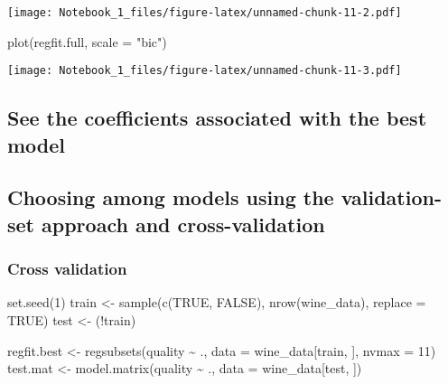 \documentclass[
]{article}
\newenvironment{Shaded}{\begin{snugshade}}{\end{snugshade}}
\newcommand{\AttributeTok}[1]{\textcolor[rgb]{0.77,0.63,0.00}{#1}}
\newcommand{\ConstantTok}[1]{\textcolor[rgb]{0.00,0.00,0.00}{#1}}
\newcommand{\DecValTok}[1]{\textcolor[rgb]{0.00,0.00,0.81}{#1}}
\newcommand{\FunctionTok}[1]{\textcolor[rgb]{0.00,0.00,0.00}{#1}}
\newcommand{\NormalTok}[1]{#1}
\newcommand{\OtherTok}[1]{\textcolor[rgb]{0.56,0.35,0.01}{#1}}
\newcommand{\SpecialCharTok}[1]{\textcolor[rgb]{0.00,0.00,0.00}{#1}}
\newcommand{\StringTok}[1]{\textcolor[rgb]{0.31,0.60,0.02}{#1}}
\begin{document}
\texttt{[image: Notebook\_1\_files/figure-latex/unnamed-chunk-11-2.pdf]}

\begin{Shaded}
\begin{Highlighting}[]
\FunctionTok{plot}\NormalTok{(regfit.full, }\AttributeTok{scale =} \StringTok{"bic"}\NormalTok{)}
\end{Highlighting}
\end{Shaded}

\texttt{[image: Notebook\_1\_files/figure-latex/unnamed-chunk-11-3.pdf]}

\hypertarget{see-the-coefficients-associated-with-the-best-model}{%
\subsection{See the coefficients associated with the best
model}\label{see-the-coefficients-associated-with-the-best-model}}

\hypertarget{choosing-among-models-using-the-validation-set-approach-and-cross-validation}{%
\subsection{Choosing among models using the validation-set approach and
cross-validation}\label{choosing-among-models-using-the-validation-set-approach-and-cross-validation}}

\hypertarget{cross-validation}{%
\subsubsection{Cross validation}\label{cross-validation}}

\begin{Shaded}
\begin{Highlighting}[]
\FunctionTok{set.seed}\NormalTok{(}\DecValTok{1}\NormalTok{)}
\NormalTok{train }\OtherTok{\textless{}{-}} \FunctionTok{sample}\NormalTok{(}\FunctionTok{c}\NormalTok{(}\ConstantTok{TRUE}\NormalTok{, }\ConstantTok{FALSE}\NormalTok{), }\FunctionTok{nrow}\NormalTok{(wine\_data), }\AttributeTok{replace =} \ConstantTok{TRUE}\NormalTok{)}
\NormalTok{test }\OtherTok{\textless{}{-}}\NormalTok{ (}\SpecialCharTok{!}\NormalTok{train)}
\end{Highlighting}
\end{Shaded}

\begin{Shaded}
\begin{Highlighting}[]
\NormalTok{regfit.best }\OtherTok{\textless{}{-}} \FunctionTok{regsubsets}\NormalTok{(quality }\SpecialCharTok{\textasciitilde{}}\NormalTok{ ., }\AttributeTok{data =}\NormalTok{ wine\_data[train, ], }\AttributeTok{nvmax =} \DecValTok{11}\NormalTok{)}
\NormalTok{test.mat }\OtherTok{\textless{}{-}} \FunctionTok{model.matrix}\NormalTok{(quality }\SpecialCharTok{\textasciitilde{}}\NormalTok{ ., }\AttributeTok{data =}\NormalTok{ wine\_data[test, ])}
\end{Highlighting}
\end{Shaded}
\end{document}
